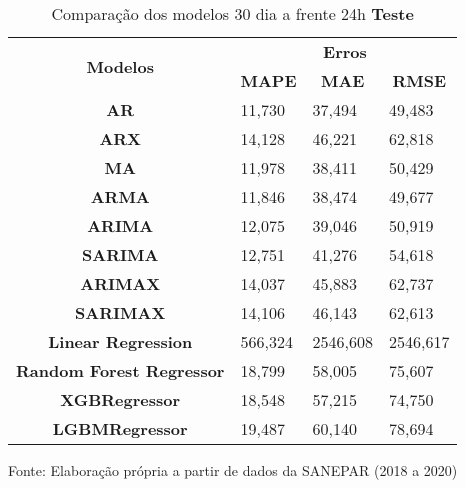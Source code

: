 \begin{table}[H]
	\centering
	\caption{Comparação dos modelos 30 dia a frente 24h \textbf{Teste} }\label{tb:30-24tst}
	\begin{tabular}{@{}clll@{}}
		\toprule
		\multirow{2}{*}{\textbf{Modelos}} & \multicolumn{3}{c}{\textbf{Erros}}                                                                       \\ \cmidrule(l){2-4} 
		& \multicolumn{1}{c}{\textbf{MAPE}} & \multicolumn{1}{c}{\textbf{MAE}} & \multicolumn{1}{c}{\textbf{RMSE}} \\ \hline
\textbf{AR}                       & 11,730                            & 37,494                           & 49,483                            \\
\textbf{ARX}                      & 14,128                            & 46,221                           & 62,818                            \\
\textbf{MA}                       & 11,978                            & 38,411                           & 50,429                            \\
\textbf{ARMA}                     & 11,846                            & 38,474                           & 49,677                            \\
\textbf{ARIMA}                    & 12,075                            & 39,046                           & 50,919                            \\
\textbf{SARIMA}                   & 12,751                            & 41,276                           & 54,618                            \\
\textbf{ARIMAX}                   & 14,037                            & 45,883                           & 62,737                            \\
\textbf{SARIMAX}                  & 14,106                            & 46,143                           & 62,613                            \\
\textbf{Linear Regression}        & 566,324                           & 2546,608                         & 2546,617                          \\
\textbf{Random Forest Regressor}  & 18,799                            & 58,005                           & 75,607                            \\
\textbf{XGBRegressor}             & 18,548                            & 57,215                           & 74,750                            \\
\textbf{LGBMRegressor}            & 19,487                            & 60,140                           & 78,694                            \\ \bottomrule
	\end{tabular}

Fonte: Elaboração própria a partir de dados da SANEPAR (2018 a 2020)
\end{table}

